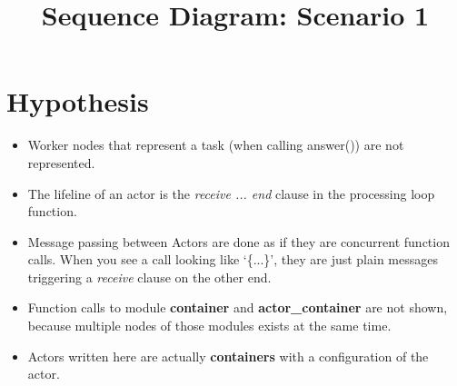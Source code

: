 \documentclass{article}
\begin{document}
\title{Sequence Diagram: Scenario 1}
\date{}

\maketitle
\thispagestyle{empty}
\section*{Hypothesis}

\begin{itemize}
	\item Worker nodes that represent a task (when calling answer()) are not 
	represented.
	\item The lifeline of an actor is the \textit{receive ... end} clause
	in the processing loop function.
	\item Message passing between Actors are done as if they are concurrent
	function calls. When you see a call looking like `\{...\}', they are 
	just plain messages triggering a \textit{receive} clause on the other end.
	\item Function calls to module \textbf{container} and 
	\textbf{actor\_container} are not shown, because multiple nodes of 
	those modules exists at the same time.
	\item Actors written here are actually \textbf{containers} with a 
	configuration of the actor.
\end{itemize}
\end{document}
